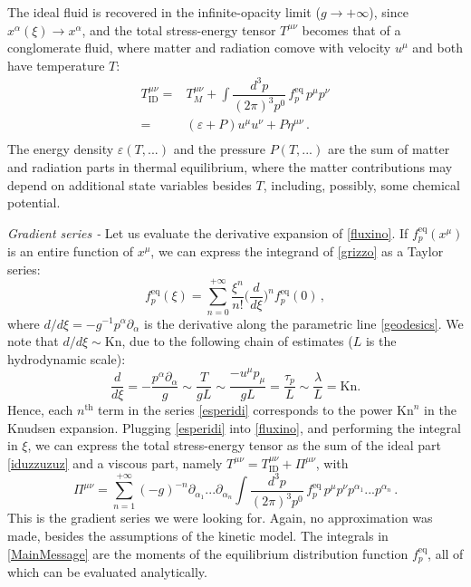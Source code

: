 \documentclass[a4paper, amsfonts, amssymb, amsmath, reprint, showkeys, twoside,notitlepage]{revtex4-2}
\newcommand{\Kn}{\text{Kn}}
\begin{document}
The ideal fluid is recovered in the infinite-opacity limit ($g\rightarrow +\infty$), since $x^\alpha(\xi)\rightarrow x^\alpha$, and the total stress-energy tensor $T^{\mu \nu}$ becomes that of a conglomerate fluid, where matter and radiation comove with velocity $u^\mu$ and both have temperature $T$:
\begin{equation}\label{iduzzuzuz}
\begin{split}
T^{\mu \nu}_{\text{ID}}={}& T^{\mu \nu}_M{+} \! \!\int \dfrac{d^3 p }{(2\pi)^3p^0} \, f^\text{eq}_p \, p^\mu p^\nu \\ ={}& (\varepsilon{+}P)u^\mu u^\nu{+}P\eta^{\mu \nu}\, .\\
\end{split}
\end{equation}
The energy density $\varepsilon(T,...)$ and the pressure $P(T,...)$ are the sum of matter and radiation parts in thermal equilibrium, where the matter contributions may depend on additional state variables besides $T$, including, possibly, some chemical potential.

\textit{Gradient series -} Let us evaluate the derivative expansion of \eqref{fluxino}. If $f^{\text{eq}}_p(x^\mu)$ is an entire function of $x^\mu$, we can express the integrand of \eqref{grizzo} as a Taylor series:
\begin{equation}\label{esperidi}
   f^{\text{eq}}_p (\xi)= \sum_{n=0}^{+\infty} \dfrac{\xi^n}{n!}\bigg(\dfrac{d}{d\xi}\bigg)^n f^{\text{{eq}}}_p(0) \, ,
\end{equation}
where $d/d\xi=-g^{-1}p^\alpha \partial_\alpha$ is the derivative along the parametric line \eqref{geodesics}. We note that $d/d\xi \sim \Kn$, due to the following chain of estimates ($L$ is the hydrodynamic scale):
\begin{equation}\label{knudso}
  \dfrac{d}{d\xi}=-\dfrac{p^\alpha \partial_\alpha}{g} \sim \dfrac{T}{gL} \sim \dfrac{-u^\mu p_\mu}{gL}=\dfrac{\tau_p}{L} \sim \dfrac{\lambda}{L}=\Kn .
\end{equation}
Hence, each $n^{\text{th}}$ term in the series \eqref{esperidi} corresponds to the power $\Kn^n$ in the Knudsen expansion.
Plugging \eqref{esperidi} into \eqref{fluxino}, and performing the integral in $\xi$, we can express the total stress-energy tensor as the sum of the ideal part \eqref{iduzzuzuz} and a viscous part, namely $T^{\mu\nu}=T^{\mu \nu}_{\text{ID}} +\Pi^{\mu \nu}$, with
\begin{equation}\label{MainMessage}
    \Pi^{\mu \nu} = \sum_{n=1}^{+\infty} (-g)^{-n} \partial_{\alpha_1}...\partial_{\alpha_n} \! \! \int \! \dfrac{d^3p}{(2\pi)^3  p^0} \, f^{\text{eq}}_p \, p^\mu p^\nu  p^{\alpha_1}...p^{\alpha_n} \, .
\end{equation}
This is the gradient series we were looking for. Again, no approximation was made, besides the assumptions of the kinetic model. The integrals in \eqref{MainMessage} are the moments of the equilibrium distribution function $f_p^{\text{eq}}$, all of which can be evaluated analytically. 
\end{document}
